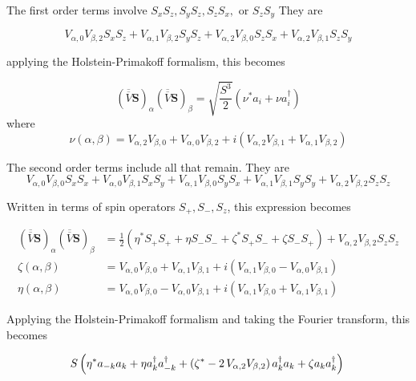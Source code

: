 \documentclass[12pt]{report}
\begin{document}
The first order terms involve $S_x S_z, S_y S_z, S_z S_x,$ or $S_z S_y $ They are 

\begin{equation}
V_{\alpha,0} V_{\beta,2} S_x S_z + V_{\alpha,1} V_{\beta,2} S_y S_z +  V_{\alpha,2} V_{\beta,0} S_z S_x + V_{\alpha,2} V_{\beta,1} S_z S_y
\end{equation}

applying the Holstein-Primakoff formalism, this becomes

\begin{equation}
 (\overline{\overline{V}} \boldsymbol{S})_{\alpha} (\overline{\overline{V}} \boldsymbol{S})_{\beta} = \sqrt{\frac{S^3}{2}} \left( \nu^* a_i + \nu a_i^{\dagger} \right)
\end{equation}
where
\begin{equation}
\nu\left(\alpha,\beta\right) = V_{\alpha,2} V_{\beta,0} + V_{\alpha,0} V_{\beta,2} +i \left (  V_{\alpha,2} V_{\beta,1} + V_{\alpha,1} V_{\beta,2} \right)
\end{equation}

The second order terms include all that remain. They are 
\begin{equation}
 V_{\alpha,0} V_{\beta,0} S_x S_x + V_{\alpha,0} V_{\beta,1} S_x S_y
 + V_{\alpha,1} V_{\beta,0} S_y S_x + V_{\alpha,1} V_{\beta,1} S_y S_y 
  +V_{\alpha,2} V_{\beta,2} S_z S_z 
\end{equation}

Written in terms of spin operators $S_+,S_-,S_z$, this expression becomes

\begin{align}
 (\overline{\overline{V}} \boldsymbol{S})_{\alpha} (\overline{\overline{V}} \boldsymbol{S})_{\beta}&=\frac{1}{2} \left( \eta^* S_+ S_+ +  \eta S_- S_- + \zeta^* S_+ S_- + \zeta S_-S_+ \right) + V_{\alpha,2} V_{\beta,2} S_z S_z \\
 \zeta\left(\alpha,\beta\right)  &= V_{\alpha,0} V_{\beta,0} + V_{\alpha,1} V_{\beta,1} +i \left (  V_{\alpha,1} V_{\beta,0} - V_{\alpha,0} V_{\beta,1} \right)\\
 \eta\left(\alpha,\beta\right) &= V_{\alpha,0} V_{\beta,0} - V_{\alpha,0} V_{\beta,1} +i \left (  V_{\alpha,1} V_{\beta,0} + V_{\alpha,1} V_{\beta,1} \right)
\end{align} 

Applying the Holstein-Primakoff formalism and taking the Fourier transform, this becomes

\begin{equation}
S \left( \eta^* a_{-k} a_k +  \eta a_{k}^{\dagger} a_{-k}^{\dagger}  + \left(\zeta^* - 2\,V_{\alpha,2} V_{\beta,2}\right) a_k^{\dagger} a_k + \zeta a_k a_k^{\dagger} \right) \\
\end{equation}
\end{document}
